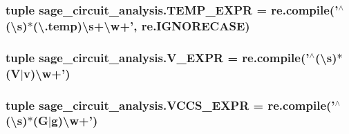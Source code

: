 \hypertarget{namespacesage__circuit__analysis_a4164fdd64fbbc924b260c7e813bf61ae}{
\subsubsection[{T\-E\-M\-P\-\_\-\-E\-X\-P\-R}]{\setlength{\rightskip}{0pt plus 5cm}tuple sage\-\_\-circuit\-\_\-analysis.\-T\-E\-M\-P\-\_\-\-E\-X\-P\-R = re.\-compile('$^\wedge$(\textbackslash{}s)$\ast$(\textbackslash{}.temp)\textbackslash{}s+\textbackslash{}w+', re.\-I\-G\-N\-O\-R\-E\-C\-A\-S\-E)}}\label{namespacesage__circuit__analysis_a4164fdd64fbbc924b260c7e813bf61ae}
\hypertarget{namespacesage__circuit__analysis_af319382f4c361c1e1d38e446e0466769}{
\subsubsection[{V\-\_\-\-E\-X\-P\-R}]{\setlength{\rightskip}{0pt plus 5cm}tuple sage\-\_\-circuit\-\_\-analysis.\-V\-\_\-\-E\-X\-P\-R = re.\-compile('$^\wedge$(\textbackslash{}s)$\ast$(V$|$v)\textbackslash{}w+')}}\label{namespacesage__circuit__analysis_af319382f4c361c1e1d38e446e0466769}
\hypertarget{namespacesage__circuit__analysis_a22033439ae0926b745e78c7e9c4aeea7}{
\subsubsection[{V\-C\-C\-S\-\_\-\-E\-X\-P\-R}]{\setlength{\rightskip}{0pt plus 5cm}tuple sage\-\_\-circuit\-\_\-analysis.\-V\-C\-C\-S\-\_\-\-E\-X\-P\-R = re.\-compile('$^\wedge$(\textbackslash{}s)$\ast$(G$|$g)\textbackslash{}w+')}}\label{namespacesage__circuit__analysis_a22033439ae0926b745e78c7e9c4aeea7}
